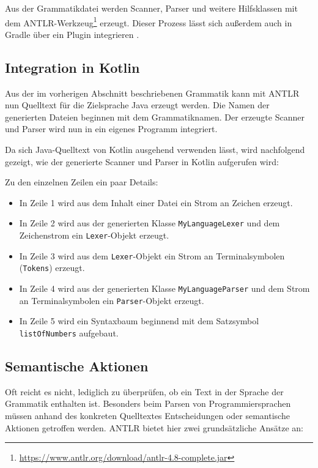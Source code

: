Aus der Grammatikdatei werden Scanner, Parser und weitere Hilfsklassen mit dem ANTLR-Werkzeug\footnote{\url{https://www.antlr.org/download/antlr-4.8-complete.jar}} erzeugt. Dieser Prozess lässt sich außerdem auch in Gradle über ein Plugin integrieren \cite{GradleANTLRPlugin}.

\subsection{Integration in Kotlin}

Aus der im vorherigen Abschnitt beschriebenen Grammatik kann mit ANTLR nun Quelltext für die Zielsprache Java erzeugt werden. Die Namen der generierten Dateien beginnen mit dem Grammatiknamen. Der erzeugte Scanner und Parser wird nun in ein eigenes Programm integriert.

Da sich Java-Quelltext von Kotlin ausgehend verwenden lässt, wird nachfolgend gezeigt, wie der generierte Scanner und Parser in Kotlin aufgerufen wird:



Zu den einzelnen Zeilen ein paar Details:
\begin{itemize}
    \item In Zeile 1 wird aus dem Inhalt einer Datei ein Strom an Zeichen erzeugt.
    \item In Zeile 2 wird aus der generierten Klasse \lstinline{MyLanguageLexer} und dem Zeichenstrom ein \lstinline{Lexer}-Objekt erzeugt.
    \item In Zeile 3 wird aus dem \lstinline{Lexer}-Objekt ein Strom an Terminalsymbolen (\lstinline{Tokens}) erzeugt.
    \item In Zeile 4 wird aus der generierten Klasse \lstinline{MyLanguageParser} und dem Strom an Terminalsymbolen ein \lstinline{Parser}-Objekt erzeugt.
    \item In Zeile 5 wird ein Syntaxbaum beginnend mit dem Satzsymbol \lstinline{listOfNumbers} aufgebaut.
\end{itemize}

\subsection{Semantische Aktionen}

Oft reicht es nicht, lediglich zu überprüfen, ob ein Text in der Sprache der Grammatik enthalten ist. Besonders beim Parsen von Programmiersprachen müssen anhand des konkreten Quelltextes Entscheidungen oder semantische Aktionen getroffen werden. ANTLR bietet hier zwei grundsätzliche Ansätze an:


